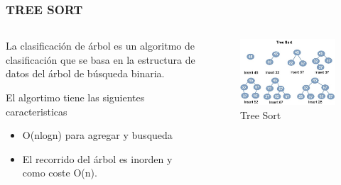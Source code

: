 \documentclass[
	11pt, %
]{beamer}
\begin{document}
\begin{frame}
	\frametitle{TREE SORT}
    \begin{columns}[t] %
		\begin{column}{0.45\textwidth} %
			 La clasificación de árbol es un algoritmo de clasificación que se basa en la estructura de datos del árbol de búsqueda binaria.
            
            El algortimo tiene las siguientes caracteristicas
            \begin{itemize}
              \item O(nlogn) para agregar y busqueda
              \item El recorrido del árbol es inorden y como coste O(n). 
            \end{itemize}
		\end{column}		
		\begin{column}{0.5\textwidth} %
			\begin{figure}
		      \includegraphics[width=0.8\linewidth]{treesorttwo_1.png}
		      \caption{Tree Sort}
	   \end{figure}
		
		\end{column}
	\end{columns}
\end{frame}
\end{document}
